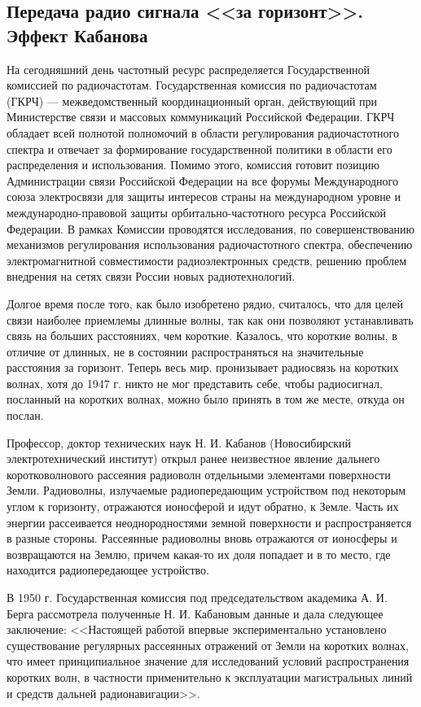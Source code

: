 \subsection{Передача радио сигнала <<за горизонт>>. Эффект Кабанова}

На сегодняшний день частотный ресурс распределяется Государственной комиссией по радиочастотам.
Государственная комиссия по радиочастотам (ГКРЧ) — межведомственный координационный орган, действующий при Министерстве связи и массовых коммуникаций Российской Федерации. ГКРЧ обладает всей полнотой полномочий в области регулирования радиочастотного спектра и отвечает за формирование государственной политики в области его распределения и использования. Помимо этого, комиссия готовит позицию Администрации связи Российской Федерации на все форумы Международного союза электросвязи для защиты интересов страны на международном уровне и международно-правовой защиты орбитально-частотного ресурса Российской Федерации. В рамках Комиссии проводятся исследования, по совершенствованию механизмов регулирования использования радиочастотного спектра, обеспечению электромагнитной совместимости радиоэлектронных средств, решению проблем внедрения на сетях связи России новых радиотехнологий.

Долгое время после того, как было изобретено рядио, считалось, что для целей связи наиболее приемлемы
длинные волны, так как они позволяют устанавливать связь на больших расстояниях, чем короткие.
Казалось, что короткие волны, в отличие от длинных, не в состоянии распространяться на значительные
расстояния за горизонт. Теперь весь мир. пронизывает радиосвязь на коротких волнах, хотя до 1947 г.
никто не мог представить себе, чтобы радиосигнал, посланный на коротких волнах, можно было принять
в том же месте, откуда он послан.

Профессор, доктор технических наук Н. И. Кабанов (Новосибирский электротехнический институт) открыл
ранее неизвестное явление дальнего коротковолнового рассеяния радиоволн отдельными элементами
поверхности Земли. Радиоволны, излучаемые радиопередающим устройством под некоторым углом к горизонту,
отражаются ионосферой и идут обратно, к Земле. Часть их энергии рассеивается неоднородностями земной
поверхности и распространяется в разные стороны. Рассеянные радиоволны вновь отражаются от ионосферы
и возвращаются на Землю, причем какая-то их доля попадает и в то место, где находится радиопередающее устройство.

В 1950 г. Государственная комиссия под председательством академика А. И. Берга рассмотрела полученные
Н. И. Кабановым данные и дала следующее заключение: <<Настоящей работой впервые экспериментально установлено
существование регулярных рассеянных отражений от Земли на коротких волнах, что имеет принципиальное
значение для исследований условий распространения коротких волн, в частности применительно к эксплуатации
магистральных линий и средств дальней радионавигации>>.

